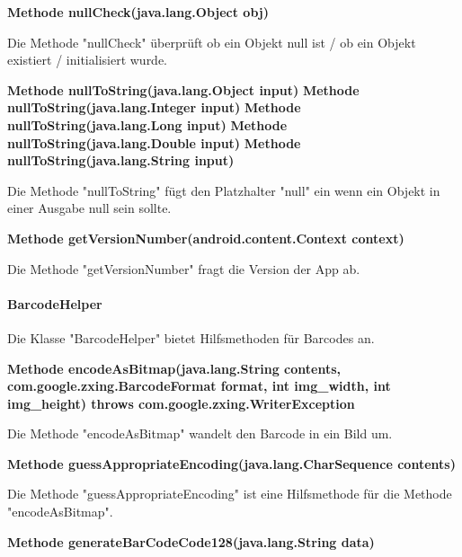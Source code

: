 \documentclass{scrartcl}
\begin{document}
\noindent\textbf{Methode nullCheck(java.lang.Object obj)}

\noindent Die Methode "nullCheck" überprüft ob ein Objekt null ist / ob ein Objekt existiert / initialisiert wurde. \newline 

\noindent\textbf{Methode nullToString(java.lang.Object input)\newline}
\noindent\textbf{Methode nullToString(java.lang.Integer input)\newline}
\noindent\textbf{Methode nullToString(java.lang.Long input)\newline}
\noindent\textbf{Methode nullToString(java.lang.Double input)\newline}
\noindent\textbf{Methode nullToString(java.lang.String input)\newline}

\noindent Die Methode "nullToString" fügt den Platzhalter "null" ein wenn ein Objekt in einer Ausgabe null sein sollte. \newline 

\noindent\textbf{Methode getVersionNumber(android.content.Context context)}

\noindent Die Methode "getVersionNumber" fragt die Version der App ab.\newline 

\paragraph{BarcodeHelper}
Die Klasse "BarcodeHelper" bietet Hilfsmethoden für Barcodes an. \newline 

\noindent\textbf{Methode encodeAsBitmap(java.lang.String contents, \newline          com.google.zxing.BarcodeFormat format, int img\_width, int img\_height) \newline 
throws com.google.zxing.WriterException}

\noindent Die Methode "encodeAsBitmap" wandelt den Barcode in ein Bild um. \newline 

\noindent\textbf{Methode guessAppropriateEncoding(java.lang.CharSequence contents)}

\noindent Die Methode "guessAppropriateEncoding" ist eine Hilfsmethode für die Methode "encodeAsBitmap". \newline 

\noindent\textbf{Methode generateBarCodeCode128(java.lang.String data)}
\end{document}
